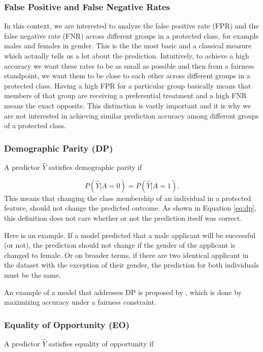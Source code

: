 \subsubsection{\textbf{False Positive and False Negative Rates}} \label{subsec:def-of-FPR} In this context, we are interested to analyze the false positive rate (FPR) and the false negative rate (FNR) across different groups in a protected class, for example males and females in gender. This is the the most basic and a classical measure which actually tells us a lot about the prediction. Intuitively, to achieve a high accuracy we want these rates to be as small as possible and then from a fairness standpoint, we want them to be close to each other across different groups in a protected class. Having a high FPR for a particular group basically means that members of that group are receiving a preferential treatment and a high FNR means the exact opposite. This distinction is vastly important and it is why we are not interested in achieving similar prediction accuracy among different groups of a protected class.


\subsubsection{\textbf{Demographic Parity (DP)}} \label{subsec:def-of-DP} A predictor $\hat{Y}$ satisfies demographic parity if 

\begin{equation} \label{eq:dp}
P(\hat{Y} | A = 0) = P(\hat{Y} | A = 1).
\end{equation}
This means that changing the class membership of an individual in a protected feature, should not change the predicted outcome. As shown in Equation \ref{eq:dp}, this definition does not care whether or not the prediction itself was correct. 

Here is an example. If a model predicted that a male applicant will be successful (or not), the prediction should not change if the gender of the applicant is changed to female. Or on broader terms, if there are two identical applicant in the dataset with the exception of their gender, the prediction for both individuals must be the same.

An example of a model that addresses DP is proposed by \citet{zafar2017fairness}, which is done by maximizing accuracy under a fairness constraint.

\subsubsection{\textbf{Equality of Opportunity (EO)}} \label{subsec:def-of-EO} A predictor $\hat{Y}$ satisfies equality of opportunity if 

